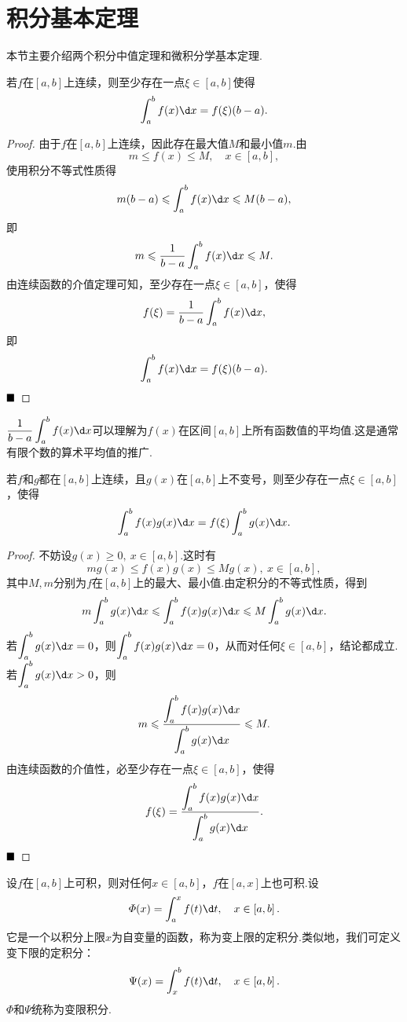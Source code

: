 \section{积分基本定理}
本节主要介绍两个积分中值定理和微积分学基本定理.
\begin{theorem}[积分第一中值定理]
	若$f$在$\left[a,b\right]$上连续，则至少存在一点$\xi \in\left[a,b\right]$使得
	$$\int_{a}^{b}f(x)\d x=f(\xi)(b-a).$$
\end{theorem}
\begin{proof}
	由于$f$在$\left[a,b\right]$上连续，因此存在最大值$M$和最小值$m$.由
	$$m\leqslant f(x)\leqslant M,\quad x\in\left[a,b\right],$$
	使用积分不等式性质得
	$$m(b-a)\leqslant\int_{a}^{b}f(x)\d x\leqslant M(b-a),$$
	即
	$$m\leqslant\frac{1}{b-a}\int_{a}^{b}f(x)\d x\leqslant M.$$
	由连续函数的介值定理可知，至少存在一点$\xi\in\left[a,b\right]$，使得
	$$f(\xi)=\frac{1}{b-a}\int_{a}^{b}f(x)\d x,$$
	即
	$$\int_{a}^{b}f(x)\d x=f(\xi)(b-a).$$
	$\hfill\blacksquare$
\end{proof}
\begin{remark}
	$\dfrac{1}{b-a}\displaystyle\int_{a}^{b}f(x)\d x$可以理解为$f(x)$在区间$\left[a,b\right]$上所有函数值的平均值.这是通常有限个数的算术平均值的推广.
\end{remark}
\begin{theorem}[推广的积分第一中值定理]
	若$f$和$g$都在$\left[a,b\right]$上连续，且$g(x)$在$\left[a,b\right]$上不变号，则至少存在一点$\xi\in\left[a,b\right]$，使得
	$$\int_{a}^{b}f(x)g(x)\d x=f(\xi)\int_{a}^{b}g(x)\d x.$$
\end{theorem}
\begin{proof}
	不妨设$g(x)\geqslant 0,\ x\in\left[a,b\right]$.这时有
	$$mg(x)\leqslant f(x)g(x)\leqslant Mg(x),\ x\in\left[a,b\right],$$
	其中$M,m$分别为$f$在$\left[a,b\right]$上的最大、最小值.由定积分的不等式性质，得到
	$$m\int_{a}^{b}g(x)\d x\leqslant\int_{a}^{b}f(x)g(x)\d x\leqslant M\int_{a}^{b}g(x)\d x.$$
	若$\displaystyle\int_{a}^{b}g(x)\d x=0$，则$\displaystyle\int_{a}^{b}f(x)g(x)\d x=0$，从而对任何$\xi\in\left[a,b\right]$，结论都成立.\\
	若$\displaystyle\int_{a}^{b}g(x)\d x>0$，则
	$$m\leqslant\frac{\displaystyle\int_{a}^{b}f(x)g(x)\d x}{\displaystyle\int_{a}^{b}g(x)\d x}\leqslant M.$$
	由连续函数的介值性，必至少存在一点$\xi\in\left[a,b\right]$，使得
	$$f(\xi)=\frac{\displaystyle\int_{a}^{b}f(x)g(x)\d x}{\displaystyle\int_{a}^{b}g(x)\d x}.$$
	$\hfill\blacksquare$
\end{proof}
\begin{definition}[变限积分]
	设$f$在$\left[a,b\right]$上可积，则对任何$x\in\left[a,b\right]$，$f$在$\left[a,x\right]$上也可积.设
	$$\varPhi(x)=\int_{a}^{x}f(t)\d t,\quad x\in\left[a,b\right].$$
	它是一个以积分上限$x$为自变量的函数，称为变上限的定积分.类似地，我们可定义变下限的定积分：
	$$\Psi(x)=\int_{x}^{b}f(t)\d t,\quad x\in\left[a,b\right].$$
	$\varPhi$和$\Psi$统称为{\heiti 变限积分}.
\end{definition}
